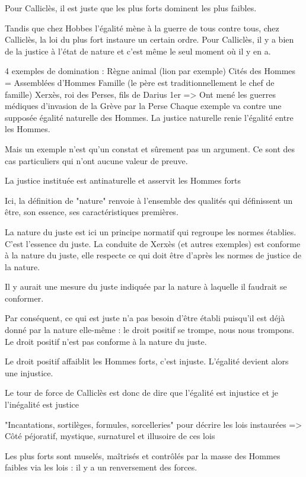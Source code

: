 \documentclass[french]{book}
\theoremstyle{definition}
\begin{document}
Pour Calliclès, il est juste que les plus forts dominent les plus faibles.

Tandis que chez Hobbes l'égalité mène à la guerre de tous contre tous, chez Calliclès, la loi du plus fort instaure un certain ordre. Pour Calliclès, il y a bien de la justice à l'état de nature et c'est même le seul moment où il y en a.

4 exemples de domination :
Règne animal (lion par exemple)
Cités des Hommes = Assemblées d'Hommes
Famille (le père est traditionnellement le chef de famille)
Xerxès, roi des Perses, fils de Darius 1er => Ont mené les guerres médiques d'invasion de la Grève par la Perse
Chaque exemple va contre une supposée égalité naturelle des Hommes. La justice naturelle renie l'égalité entre les Hommes.

Mais un exemple n'est qu'un constat et sûrement pas un argument. Ce sont des cas particuliers qui n'ont aucune valeur de preuve.

La justice instituée est antinaturelle et asservit les Hommes forts

Ici, la définition de "nature" renvoie à l'ensemble des qualités qui définissent un être, son essence, ses caractéristiques premières.

La nature du juste est ici un principe normatif qui regroupe les normes établies. C'est l'essence du juste.
La conduite de Xerxès (et autres exemples) est conforme à la nature du juste, elle respecte ce qui doit être d'après les normes de justice de la nature.

Il y aurait une mesure du juste indiquée par la nature à laquelle il faudrait se conformer.

Par conséquent, ce qui est juste n'a pas besoin d'être établi puisqu'il est déjà donné par la nature elle-même : le droit positif se trompe, nous nous trompons. Le droit positif n'est pas conforme à la nature du juste.

Le droit positif affaiblit les Hommes forts, c'est injuste. L'égalité devient alors une injustice.

Le tour de force de Calliclès est donc de dire que l'égalité est injustice et je l'inégalité est justice

"Incantations, sortilèges, formules, sorcelleries" pour décrire les lois instaurées
=> Côté péjoratif, mystique, surnaturel et illusoire de ces lois

Les plus forts sont muselés, maîtrisés et contrôlés par la masse des Hommes faibles via les lois : il y a un renversement des forces.
\end{document}
